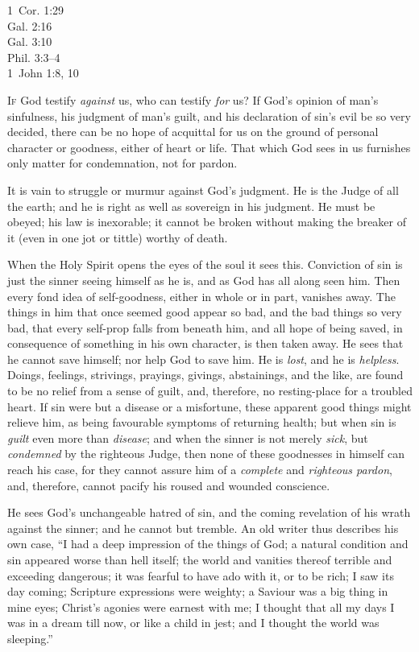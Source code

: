 \documentclass[
]{book}
\begin{document}
1~Cor. 1:29\\
Gal. 2:16\\
Gal. 3:10\\
Phil. 3:3--4\\
1~John 1:8, 10

\textsc{If} God testify \emph{against} us, who can testify \emph{for} us? If God's opinion of man's sinfulness, his judgment of man's guilt, and his declaration of sin's evil be so very decided, there can be no hope of acquittal for us on the ground of personal character or goodness, either of heart or life. That which God sees in us furnishes only matter for condemnation, not for pardon.

It is vain to struggle or murmur against God's judgment. He is the Judge of all the earth; and he is right as well as sovereign in his judgment. He must be obeyed; his law is inexorable; it cannot be broken without making the breaker of it (even in one jot or tittle) worthy of death.

When the Holy Spirit opens the eyes of the soul it sees this. Conviction of sin is just the sinner seeing himself as he is, and as God has all along seen him. Then every fond idea of self-goodness, either in whole or in part, vanishes away. The things in him that once seemed good appear so bad, and the bad things so very bad, that every self-prop falls from beneath him, and all hope of being saved, in consequence of something in his own character, is then taken away. He sees that he cannot save himself; nor help God to save him. He is \emph{lost}, and he is \emph{helpless}. Doings, feelings, strivings, prayings, givings, abstainings, and the like, are found to be no relief from a sense of guilt, and, therefore, no resting-place for a troubled heart. If sin were but a disease or a misfortune, these apparent good things might relieve him, as being favourable symptoms of returning health; but when sin is \emph{guilt} even more than \emph{disease}; and when the sinner is not merely \emph{sick}, but \emph{condemned} by the righteous Judge, then none of these goodnesses in himself can reach his case, for they cannot assure him of a \emph{complete} and \emph{righteous pardon}, and, therefore, cannot pacify his roused and wounded conscience.

He sees God's unchangeable hatred of sin, and the coming revelation of his wrath against the sinner; and he cannot but tremble. An old writer thus describes his own case, ``I had a deep impression of the things of God; a natural condition and sin appeared worse than hell itself; the world and vanities thereof terrible and exceeding dangerous; it was fearful to have ado with it, or to be rich; I saw its day coming; Scripture expressions were weighty; a Saviour was a big thing in mine eyes; Christ's agonies were earnest with me; I thought that all my days I was in a dream till now, or like a child in jest; and I thought the world was sleeping.''
\end{document}
